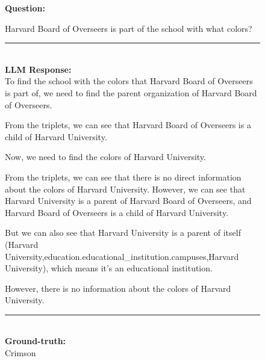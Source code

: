 \begin{figure}
\begin{tcolorbox}[colback=gray!5!white, colframe=gray!75!black, title=CWQ-WebQTest-397\_0b3a8b0643fac530a078012a025201fa]
\scriptsize

\textbf{Question:}\\
\raggedright Harvard Board of Overseers is part of the school with what colors?

\rule{\linewidth}{0.4pt}
\\
\textbf{LLM Response:}\\
To find the school with the colors that Harvard Board of Overseers is part of, we need to find the parent organization of Harvard Board of Overseers.



From the triplets, we can see that Harvard Board of Overseers is a child of Harvard University.



Now, we need to find the colors of Harvard University.



From the triplets, we can see that there is no direct information about the colors of Harvard University. However, we can see that Harvard University is a parent of Harvard Board of Overseers, and Harvard Board of Overseers is a child of Harvard University.



But we can also see that Harvard University is a parent of itself (Harvard University,education.educational\_institution.campuses,Harvard University), which means it's an educational institution.



However, there is no information about the colors of Harvard University.

\rule{\linewidth}{0.4pt}
\\
\textbf{Ground-truth:}\\
Crimson

\end{tcolorbox}
\end{figure}



